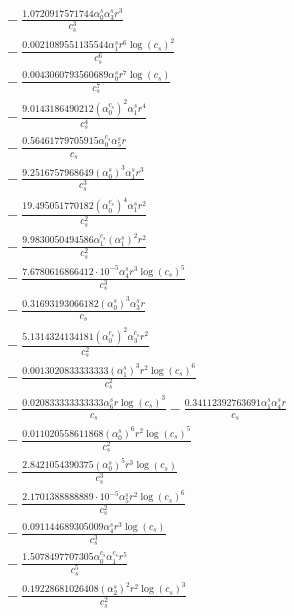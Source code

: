 \documentclass[10pt]{article}
\begin{document}
\begin{align*}
&{}  - \frac{1.0720917571744 \alpha_{0}^s \alpha_{3}^s r^{3}}{c_{s}^{3}} \\
&{}  - \frac{0.0021089551135544 \alpha_{1}^s r^{6} \log{\left(c_{s} \right)}^{2}}{c_{s}^{6}} \\
&{}  - \frac{0.0043060793560689 \alpha_{0}^s r^{7} \log{\left(c_{s} \right)}}{c_{s}^{7}} \\
&{}  - \frac{9.0143186490212 \left(\alpha_{0}^{c_s}\right)^{2} \alpha_{1}^s r^{4}}{c_{s}^{4}} \\
&{}  - \frac{0.56461779705915 \alpha_{0}^{c_s} \alpha_{5}^s r}{c_{s}} \\
&{}  - \frac{9.2516757968649 \left(\alpha_{0}^s\right)^{3} \alpha_{1}^s r^{3}}{c_{s}^{3}} \\
&{}  - \frac{19.495051770182 \left(\alpha_{0}^{c_s}\right)^{4} \alpha_{1}^s r^{2}}{c_{s}^{2}} \\
&{}  - \frac{9.9830050494586 \alpha_{1}^{c_s} \left(\alpha_{1}^s\right)^{2} r^{2}}{c_{s}^{2}} \\
&{}  - \frac{7.6780616866412 \cdot 10^{-5} \alpha_{4}^s r^{3} \log{\left(c_{s} \right)}^{5}}{c_{s}^{3}} \\
&{}  - \frac{0.31693193066182 \left(\alpha_{0}^s\right)^{3} \alpha_{3}^s r}{c_{s}} \\
&{}  - \frac{5.1314324134181 \left(\alpha_{0}^{c_s}\right)^{2} \alpha_{3}^{c_s} r^{2}}{c_{s}^{2}} \\
&{}  - \frac{0.0013020833333333 \left(\alpha_{1}^s\right)^{3} r^{2} \log{\left(c_{s} \right)}^{6}}{c_{s}^{2}} \\
&{}  - \frac{0.020833333333333 \alpha_{6}^s r \log{\left(c_{s} \right)}^{3}}{c_{s}} - \frac{0.34112392763691 \alpha_{1}^s \alpha_{4}^s r}{c_{s}} \\
&{}  - \frac{0.011020558611868 \left(\alpha_{0}^s\right)^{6} r^{2} \log{\left(c_{s} \right)}^{5}}{c_{s}^{2}} \\
&{}  - \frac{2.8421054390375 \left(\alpha_{0}^s\right)^{5} r^{3} \log{\left(c_{s} \right)}}{c_{s}^{3}} \\
&{}  - \frac{2.1701388888889 \cdot 10^{-5} \alpha_{5}^s r^{2} \log{\left(c_{s} \right)}^{6}}{c_{s}^{2}} \\
&{}  - \frac{0.091144689305009 \alpha_{4}^s r^{3} \log{\left(c_{s} \right)}}{c_{s}^{3}} \\
&{}  - \frac{1.5078497707305 \alpha_{0}^{c_s} \alpha_{1}^{c_s} r^{5}}{c_{s}^{5}} \\
&{}  - \frac{0.19228681026408 \left(\alpha_{2}^s\right)^{2} r^{2} \log{\left(c_{s} \right)}^{3}}{c_{s}^{2}} \\

\end{align*}
\end{document}

